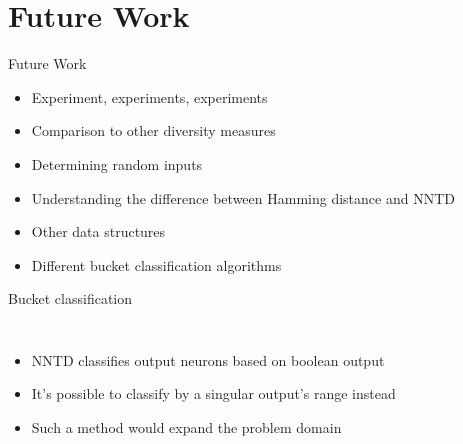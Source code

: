 \section{Future Work}
\begin{frame}{Future Work}
  \begin{itemize}
    \item Experiment, experiments, experiments
    \item Comparison to other diversity measures
    \item Determining random inputs %
    \item Understanding the difference between Hamming distance and NNTD
    \item Other data structures
    \item Different bucket classification algorithms
  \end{itemize}
\end{frame}

\begin{frame}{Bucket classification}
  \begin{columns}
    \column{0.5\paperwidth}
    \begin{itemize}
      \item NNTD classifies output neurons based on boolean output
      \item It's possible to classify by a singular output's range instead
      \item Such a method would expand the problem domain
    \end{itemize}

    \column{0.5\paperwidth}
    \begin{figure}[htbp]
      \centering
      
    \end{figure}
  \end{columns}
\end{frame}
